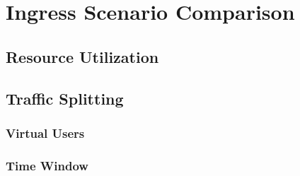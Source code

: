 \chapter{Ingress Scenario Comparison}
\label{cha:ingress_compare}


\section{Resource Utilization}
\label{sec:traffic_concept}


\section{Traffic Splitting}
\label{sec:traffic_mngmnt}


\subsection{Virtual Users}
\label{sec:vus}

\subsection{Time Window}
\label{sec:time_wind}

